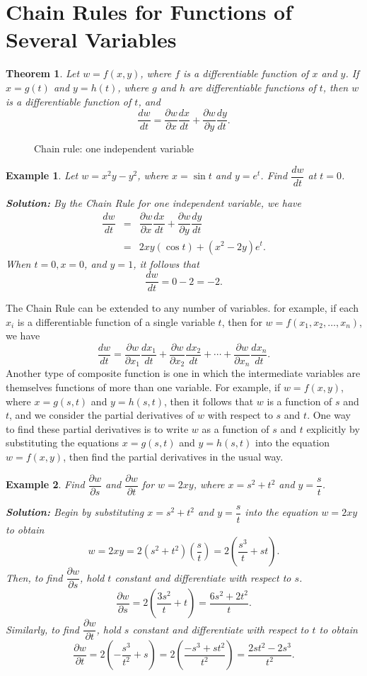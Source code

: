 \documentclass[titlepage,a4paper,12pt]{report}
\newtheorem{example}{Example}[section]
\newtheorem{theorem}{Theorem}[section]
\begin{document}
\section{Chain Rules for Functions of Several Variables}
\begin{theorem}
Let $w=f(x,y)$, where $f$ is a differentiable   function of $x$ and $y$. If $x=g(t)$ and $y=h(t)$, where $g$ and $h$ are differentiable functions of $t$, then $w$ is a differentiable function of $t$, and 
\[\dfrac{dw}{dt}=\dfrac{\partial w }{\partial x}\dfrac{dx}{dt}+\dfrac{\partial w}{\partial y}\dfrac{dy}{dt}.\]
\end{theorem}
\begin{figure}[h!]

\caption{Chain rule: one independent variable}
\end{figure}
\begin{example}
Let $w=x^2y-y^2$, where $x=\sin t$ and $y=e^t$. Find $\dfrac{dw}{dt}$ at $t=0$.

\noindent \textbf{Solution:} By the Chain Rule for one independent variable, we have
\begin{eqnarray*}
\dfrac{dw}{dt} &=& \dfrac{\partial w }{\partial x}\dfrac{dx}{dt}+\dfrac{\partial w}{\partial y}\dfrac{dy}{dt}\\
&=& 2xy(\cos t)+ (x^2-2y)e^t.
\end{eqnarray*}
When $t=0, x=0$, and $y=1$, it follows that 
\[\dfrac{dw}{dt}=0-2=-2.\] 
\end{example}
\noindent The Chain Rule can be extended to any number of variables. for example, if each $x_i$ is a differentiable function of a single variable $t$, then for $w=f(x_1, x_2, \dots , x_n)$, we have 
\[\dfrac{dw}{dt}=\dfrac{\partial w }{\partial x_1}\dfrac{dx_1}{dt}+\dfrac{\partial w}{\partial x_2}\dfrac{dx_2}{dt}+\cdots +\dfrac{\partial w}{\partial x_n}\dfrac{dx_n}{dt}.\]
Another type of composite function is one in which the intermediate variables are  themselves functions of more than one variable. For example, if $w=f(x,y)$, where $x=g(s,t)$ and $y=h(s,t)$, then it follows that $w$ is a function of $s$ and $t$, and we consider the partial derivatives of $w$ with respect to $s$ and $t$. One way to find these partial derivatives is to write $w$ as a function of $s$ and $t$ explicitly by substituting the equations $x=g(s,t)$ and $y=h(s,t)$ into the equation $w=f(x,y)$, then find the partial derivatives in the usual way.
\begin{example}
Find $\dfrac{\partial w}{\partial s}$ and $\dfrac{\partial w}{\partial t}$ for $w=2xy$, where $x=s^2+t^2$ and $y=\dfrac{s}{t}$.

\noindent \textbf{Solution:} Begin by substituting $x=s^2+t^2$ and $y=\dfrac{s}{t}$
 into the equation $w=2xy$ to obtain 
 \[ w=2xy =2(s^2+t^2)\left(\dfrac{s}{t}\right)=2\left(\dfrac{s^3}{t}+st\right).\] 
 Then, to find $\dfrac{\partial w}{\partial s}$, hold $t$ constant and differentiate with respect to $s$.
 \[\dfrac{\partial w}{\partial s} =2\left(\dfrac{3s^2}{t}+t\right)=\dfrac{6s^2+2t^2}{t}.\] Similarly, to find $\dfrac{\partial w}{\partial t}$, hold $s$ constant and differentiate with respect to $t$ to obtain 
 \[\dfrac{\partial w}{\partial t}=2\left(-\dfrac{s^3}{t^2}+s\right)=2\left(\dfrac{-s^3+st^2}{t^2}\right)=\dfrac{2st^2-2s^3}{t^2}.\]
  \end{example}
\end{document}
